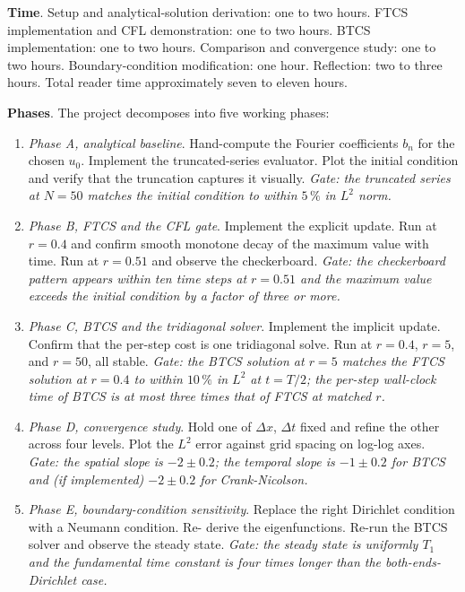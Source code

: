 \begin{project}
\textbf{Time}. Setup and analytical-solution derivation: one to
two hours. FTCS implementation and CFL demonstration: one to two
hours. BTCS implementation: one to two hours. Comparison and
convergence study: one to two hours. Boundary-condition
modification: one hour. Reflection: two to three hours. Total
reader time approximately seven to eleven hours.

\textbf{Phases}. The project decomposes into five working phases:

\begin{enumerate}[leftmargin=*]
  \item \emph{Phase A, analytical baseline}. Hand-compute the
    Fourier coefficients $b_{n}$ for the chosen $u_{0}$. Implement
    the truncated-series evaluator. Plot the initial condition and
    verify that the truncation captures it visually. \emph{Gate:
    the truncated series at $N = 50$ matches the initial condition
    to within $5\,\%$ in $L^{2}$ norm.}
  \item \emph{Phase B, FTCS and the CFL gate}. Implement the
    explicit update. Run at $r = 0.4$ and confirm smooth
    monotone decay of the maximum value with time. Run at
    $r = 0.51$ and observe the checkerboard. \emph{Gate: the
    checkerboard pattern appears within ten time steps at
    $r = 0.51$ and the maximum value exceeds the initial
    condition by a factor of three or more.}
  \item \emph{Phase C, BTCS and the tridiagonal solver}. Implement
    the implicit update. Confirm that the per-step cost is one
    tridiagonal solve. Run at $r = 0.4$, $r = 5$, and $r = 50$,
    all stable. \emph{Gate: the BTCS solution at $r = 5$ matches
    the FTCS solution at $r = 0.4$ to within $10\,\%$ in $L^{2}$
    at $t = T/2$; the per-step wall-clock time of BTCS is at
    most three times that of FTCS at matched $r$.}
  \item \emph{Phase D, convergence study}. Hold one of $\Delta x$,
    $\Delta t$ fixed and refine the other across four levels.
    Plot the $L^{2}$ error against grid spacing on log-log axes.
    \emph{Gate: the spatial slope is $-2 \pm 0.2$; the temporal
    slope is $-1 \pm 0.2$ for BTCS and (if implemented)
    $-2 \pm 0.2$ for Crank-Nicolson.}
  \item \emph{Phase E, boundary-condition sensitivity}. Replace
    the right Dirichlet condition with a Neumann condition. Re-
    derive the eigenfunctions. Re-run the BTCS solver and observe
    the steady state. \emph{Gate: the steady state is uniformly
    $T_{1}$ and the fundamental time constant is four times longer
    than the both-ends-Dirichlet case.}
\end{enumerate}


\end{project}
